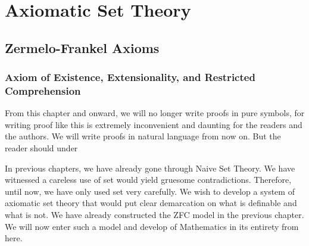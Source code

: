 \chapter{Axiomatic Set Theory}
\section{Zermelo-Frankel Axioms}
\subsection{Axiom of Existence, Extensionality, and Restricted Comprehension}
\begin{rem}
    From this chapter and onward, we will no longer write proofs in pure symbols, for writing proof like this is extremely inconvenient and daunting for the readers and the authors. We will write proofs in natural language from now on. But the reader should under
\end{rem}
In previous chapters, we have already gone through Naive Set Theory. We have witnessed a careless use of set would yield gruesome contradictions. Therefore, until now, we have only used set very carefully. We wish to develop a system of axiomatic set theory that would put clear demarcation on what is definable and what is not. We have already constructed the ZFC model in the previous chapter. We will now enter such a model and develop of Mathematics in its entirety from here.\\

